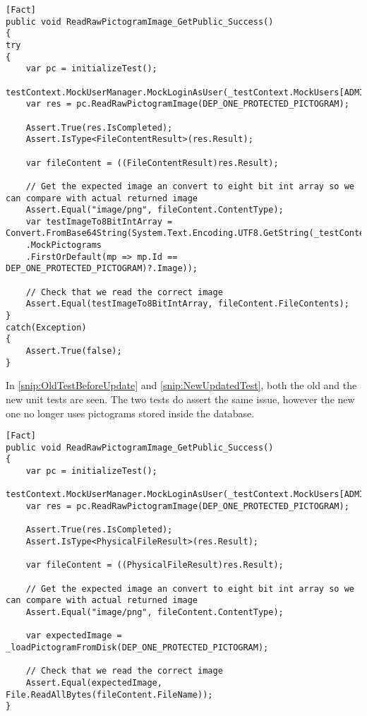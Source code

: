 \begin{lstlisting}[label={snip:OldTestBeforeUpdate}, caption={The old test after images are served from disk}, captionpos=b, language=CSharp] 
[Fact]
public void ReadRawPictogramImage_GetPublic_Success()
{
try
{
    var pc = initializeTest();
    testContext.MockUserManager.MockLoginAsUser(_testContext.MockUsers[ADMIN_DEP_ONE]);
    var res = pc.ReadRawPictogramImage(DEP_ONE_PROTECTED_PICTOGRAM);

    Assert.True(res.IsCompleted);
    Assert.IsType<FileContentResult>(res.Result);

    var fileContent = ((FileContentResult)res.Result);

    // Get the expected image an convert to eight bit int array so we can compare with actual returned image
    Assert.Equal("image/png", fileContent.ContentType);
    var testImageTo8BitIntArray = Convert.FromBase64String(System.Text.Encoding.UTF8.GetString(_testContext
    .MockPictograms
    .FirstOrDefault(mp => mp.Id == DEP_ONE_PROTECTED_PICTOGRAM)?.Image));

    // Check that we read the correct image
    Assert.Equal(testImageTo8BitIntArray, fileContent.FileContents);
}
catch(Exception)
{
    Assert.True(false);
}
\end{lstlisting}

In \autoref{snip:OldTestBeforeUpdate} and \autoref{snip:NewUpdatedTest}, both the old and the new unit tests are seen. 
The two tests do assert the same issue, however the new one no longer uses pictograms stored inside the database.

\begin{lstlisting}[label={snip:NewUpdatedTest}, caption={The updated test after images are served from disk}, captionpos=b, language=CSharp] 
[Fact]
public void ReadRawPictogramImage_GetPublic_Success()
{
    var pc = initializeTest();
    testContext.MockUserManager.MockLoginAsUser(_testContext.MockUsers[ADMIN_DEP_ONE]);
    var res = pc.ReadRawPictogramImage(DEP_ONE_PROTECTED_PICTOGRAM);

    Assert.True(res.IsCompleted);
    Assert.IsType<PhysicalFileResult>(res.Result);

    var fileContent = ((PhysicalFileResult)res.Result);

    // Get the expected image an convert to eight bit int array so we can compare with actual returned image
    Assert.Equal("image/png", fileContent.ContentType);
            
    var expectedImage = _loadPictogramFromDisk(DEP_ONE_PROTECTED_PICTOGRAM);

    // Check that we read the correct image
    Assert.Equal(expectedImage, File.ReadAllBytes(fileContent.FileName));      
}
\end{lstlisting}

